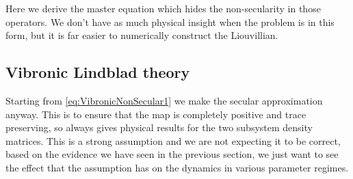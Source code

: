 \documentclass[]{article}
\begin{document}
\begin{itemize}
\begin{itemize}
Here we derive the master equation which hides the non-secularity in those operators. We don't have as much physical insight when the problem is in this form, but it is far easier to numerically construct the Liouvillian.

\subsection{Vibronic Lindblad theory}
\label{ssec:sec}
Starting from \ref{eq:VibronicNonSecular1} we make the secular approximation anyway. This is to ensure that the map is completely positive and trace preserving, so always gives physical results for the two subsystem density matrices. This is a strong assumption and we are not expecting it to be correct, based on the evidence we have seen in the previous section, we just want to see the effect that the assumption has on the dynamics in various parameter regimes.


\end{itemize}
\end{itemize}
\end{document}
